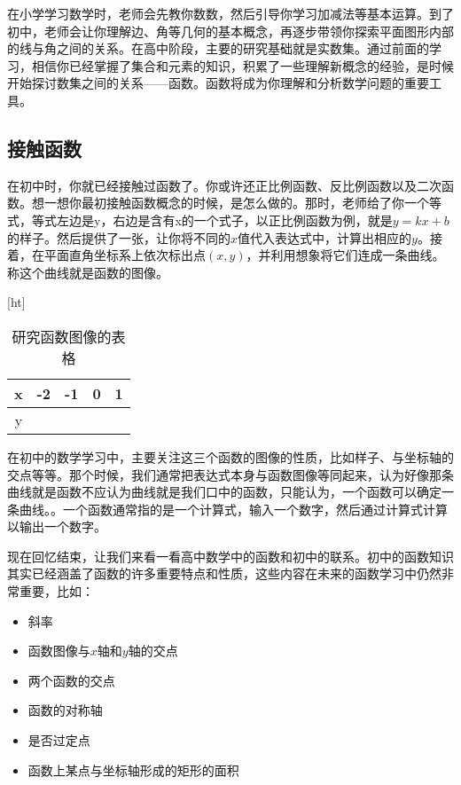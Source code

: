 

\begin{issues}
\issueDraft
\end{issues}


在小学学习数学时，老师会先教你数数，然后引导你学习加减法等基本运算。到了初中，老师会让你理解边、角等几何的基本概念，再逐步带领你探索平面图形内部的线与角之间的关系。在高中阶段，主要的研究基础就是实数集。通过前面的学习，相信你已经掌握了集合和元素的知识，积累了一些理解新概念的经验，是时候开始探讨数集之间的关系——函数。函数将成为你理解和分析数学问题的重要工具。

\subsection{接触函数}

在初中时，你就已经接触过函数了。你或许还正比例函数、反比例函数以及二次函数。想一想你最初接触函数概念的时候，是怎么做的。那时，老师给了你一个等式，等式左边是y，右边是含有x的一个式子，以正比例函数为例，就是$y=kx+b$的样子。然后提供了一张，让你将不同的$x$值代入表达式中，计算出相应的$y$。接着，在平面直角坐标系上依次标出点$(x,y)$，并利用想象将它们连成一条曲线。称这个曲线就是函数的图像。

\begin{table}\label{tab_functi_1}[ht]
\centering
\caption{研究函数图像的表格}\label{tab_functi1}
\begin{tabular}{|c|c|c|c|c|}
\hline
x & -2 & -1 & 0 & 1 \\
\hline
y &   &   &   &   \\
\hline
\end{tabular}
\end{table}

在初中的数学学习中，主要关注这三个函数的图像的性质，比如样子、与坐标轴的交点等等。那个时候，我们通常把表达式本身与函数图像等同起来，认为好像那条曲线就是函数不应认为曲线就是我们口中的函数，只能认为，一个函数可以确定一条曲线。。一个函数通常指的是一个计算式，输入一个数字，然后通过计算式计算以输出一个数字。

现在回忆结束，让我们来看一看高中数学中的函数和初中的联系。初中的函数知识其实已经涵盖了函数的许多重要特点和性质，这些内容在未来的函数学习中仍然非常重要，比如：
\begin{itemize}
\item 斜率
\item 函数图像与$x$轴和$y$轴的交点
\item 两个函数的交点
\item 函数的对称轴
\item 是否过定点
\item 函数上某点与坐标轴形成的矩形的面积
\end{itemize}

